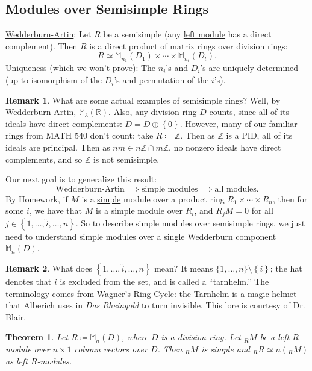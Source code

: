 \documentclass[12pt]{article}
\newcommand{\z}{\mathbb{Z}}
\newcommand{\real}{\mathbb{R}}
\newcommand{\ita}[1]{\textit{#1}}
\newcommand{\oneton}[1]{\{1,\dotsc,#1\}}
\newcommand\setb[1]{\left \{ #1 \right \}}
\newtheorem{theorem}{Theorem}[section]
\theoremstyle{definition}
\newtheorem*{remark}{Remark}
\newcommand{\m}{\mathbb{M}}
\begin{document}
\subsection{Modules over Semisimple Rings}
\underline{Wedderburn-Artin}: Let $R$ be a semisimple (any \underline{left module} has a direct complement). Then $R$ is a direct product of matrix rings over division rings:
\begin{equation}
    \boxed{R \simeq \m_{n_1}(D_1) \times \dotsb \times \m_{n_t}(D_t).}
\end{equation}
\underline{Uniqueness (which we won't prove)}: The $n_i$'s and $D_i$'s are uniquely determined (up to isomorphism of the $D_i$'s and permutation of the $i$'s).
\begin{remark}
    What are some actual examples of semisimple rings? Well, by Wedderburn-Artin, $\m_3(\real)$. Also, any division ring $D$ counts, since all of its ideals have direct complements: $D = D \oplus \setb{ 0 }$. However, many of our familiar rings from MATH 540 don't count: take $R \coloneqq  \z$. Then as $\z$ is a PID, all of its ideals are principal. Then as $nm \in n\z \cap m\z$, no nonzero ideals have direct complements, and so $\z$ is not semisimple. 
\end{remark}
Our next goal is to generalize this result:
\begin{equation}
    \text{Wedderburn-Artin} \implies \text{simple modules} \implies \text{all modules}.
\end{equation}
By Homework, if $M$ is a \underline{simple} module over a product ring $R_1 \times \dotsb \times R_n$, then for some $i$, we have that $M$ is a simple module over $R_i$, and $R_jM = 0$ for all $j \in \setb{1 , \dotsc , \hat{i} , \dotsc , n}$. So to describe simple modules over semisimple rings, we just need to understand simple modules over a single Wedderburn component $\m_n(D)$.
\begin{remark}
    What does $\setb{1 , \dotsc , \hat{i} , \dotsc , n}$ mean? It means $\oneton{n} \setminus \setb{ i }$; the hat denotes that $i$ is excluded from the set, and is called a ``tarnhelm.'' The terminology comes from Wagner's Ring Cycle: the Tarnhelm is a magic helmet that Alberich uses in \ita{Das Rheingold} to turn invisible. This lore is courtesy of Dr. Blair.
\end{remark}
\begin{theorem}
    Let $R \coloneqq  \m_n(D)$, where $D$ is a division ring. Let $_RM$ be a left $R$-module over $n \times 1$ column vectors over $D$. Then $_RM$ is simple and $_RR \simeq n\left(_RM\right)$ as left $R$-modules.
\end{theorem}
\end{document}
